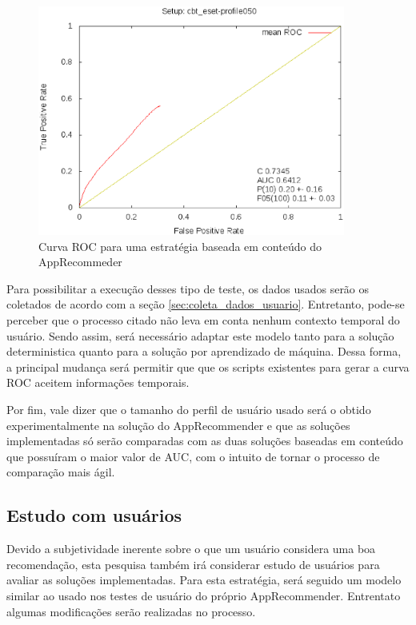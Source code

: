 \begin{figure}[h]
  \centering
  \includegraphics[width=0.9\textwidth]{figuras/roc_apprecommender.eps}
  \caption{Curva ROC para uma estratégia baseada em conteúdo do AppRecommeder}
  \label{fig:roc_apprecommender}
\end{figure}


Para possibilitar a execução desses tipo de teste, os dados usados serão os
coletados de acordo com a seção \ref{sec:coleta_dados_usuario}. Entretanto,
pode-se perceber que o processo citado não leva em conta nenhum contexto temporal
do usuário. Sendo assim, será necessário adaptar este modelo tanto para a
solução deterministica quanto para a solução por aprendizado de máquina. Dessa
forma, a principal mudança será permitir que que os scripts existentes para
gerar a curva ROC aceitem informações temporais.

Por fim, vale dizer que o tamanho do perfil de usuário usado será o obtido
experimentalmente na solução do AppRecommender e que as soluções implementadas
só serão comparadas com as duas soluções baseadas em conteúdo que possuíram o
maior valor de AUC, com o intuito de tornar o processo de comparação mais ágil.

\subsection{Estudo com usuários}

Devido a subjetividade inerente sobre o que um usuário considera uma boa
recomendação, esta pesquisa também irá considerar estudo de usuários para
avaliar as soluções implementadas. Para esta estratégia, será seguido um modelo
similar ao usado nos testes de usuário do próprio AppRecommender. Entrentato
algumas modificações serão realizadas no processo.

